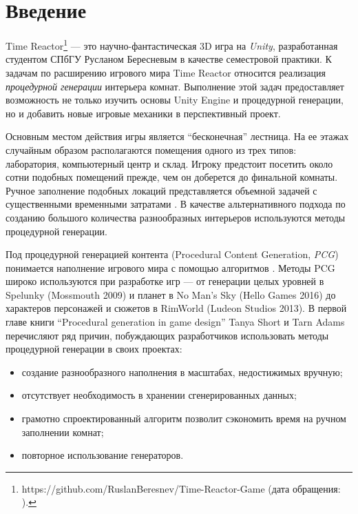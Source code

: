 
\section{Введение}
\thispagestyle{withCompileDate}

Time Reactor\footnote{https://github.com/RuslanBeresnev/Time-Reactor-Game (дата обращения: ).} --- это научно-фантастическая 3D игра на \textit{Unity}, разработанная студентом СПбГУ Русланом Бересневым в качестве семестровой практики. К задачам по расширению игрового мира Time Reactor относится реализация \textit{процедурной генерации} интерьера комнат.  Выполнение этой задач предоставляет возможность не только изучить основы Unity Engine и процедурной генерации, но и добавить новые игровые механики в перспективный проект.

Основным местом действия игры является \enquote{бесконечная} лестница. На ее этажах случайным образом располагаются помещения одного из трех типов: лаборатория, компьютерный центр и склад. Игроку предстоит посетить около сотни подобных помещений прежде, чем он доберется до финальной комнаты. Ручное заполнение подобных локаций представляется объемной задачей с существенными временными затратами \cite{short2017procedural}. В качестве альтернативного подхода по созданию большого количества разнообразных интерьеров используются методы процедурной генерации.
    
Под процедурной генерацией контента (Procedural Content Ge\-ne\-ra\-ti\-on, \textit{PCG}) понимается наполнение игрового мира с помощью алгоритмов \cite{article}. Методы PCG широко используются при разработке игр \cite{dahren2021usage} --- от генерации целых уровней в Spelunky (Mossmouth 2009) и планет
в No Man’s Sky (Hello Games 2016) до характеров персонажей и сюжетов в RimWorld (Ludeon Studios 2013). В первой главе книги \enquote{Procedural generation in game design} Tanya Short и Tarn Adams перечисляют ряд причин, побуждающих разработчиков использовать методы процедурной генерации в своих проектах:
\begin{itemize}
    \item создание разнообразного наполнения в масштабах, недостижимых вручную;
    \item отсутствует необходимость в хранении сгенерированных данных;
    \item грамотно спроектированный алгоритм позволит сэкономить время на ручном заполнении комнат;
    \item повторное использование генераторов.
\end{itemize}

